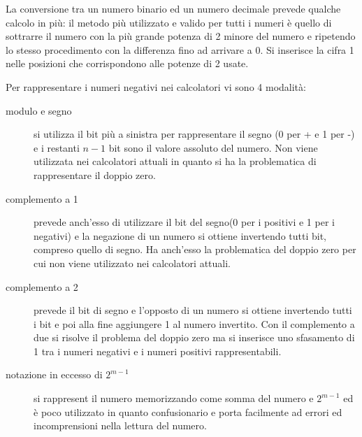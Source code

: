 La conversione tra un numero binario ed un numero decimale prevede qualche calcolo in più:
il metodo più utilizzato e valido per tutti i numeri è quello di sottrarre il numero
con la più grande potenza di 2 minore del numero e ripetendo lo stesso procedimento
con la differenza fino ad arrivare a 0.\newline
Si inserisce la cifra 1 nelle posizioni che corrispondono alle potenze di 2 usate.

Per rappresentare i numeri negativi nei calcolatori vi sono 4 modalità:
\begin{description}
  \item[modulo e segno] si utilizza il bit più a sinistra per rappresentare il segno
        (0 per + e 1 per -) e i restanti $n-1$ bit sono il valore assoluto del numero.\newline
        Non viene utilizzata nei calcolatori attuali in quanto si ha la problematica
        di rappresentare il doppio zero.
  \item[complemento a 1] prevede anch'esso di utilizzare il bit del segno(0 per i positivi e 1 per i negativi)
        e la negazione di un numero si ottiene invertendo tutti bit, compreso quello di segno.
        Ha anch'esso la problematica del doppio zero per cui non viene utilizzato nei calcolatori attuali.
  \item[complemento a 2] prevede il bit di segno e l'opposto di un numero si ottiene
        invertendo tutti i bit e poi alla fine aggiungere 1 al numero invertito.
        Con il complemento a due si risolve il problema del doppio zero ma si inserisce
        uno sfasamento di 1 tra i numeri negativi e i numeri positivi rappresentabili.
  \item[notazione in eccesso di $2^{m-1}$] si rappresent il numero memorizzando come
        somma del numero e $2^{m-1}$ ed è poco utilizzato in quanto confusionario e
        porta facilmente ad errori ed incomprensioni nella lettura del numero.
\end{description}

